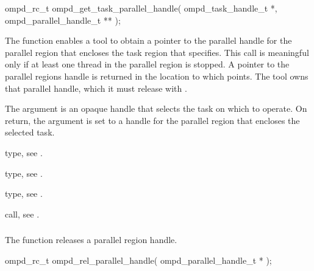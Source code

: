 \format
\begin{cspecific}
\begin{ompSyntax}
ompd_rc_t ompd_get_task_parallel_handle(
  ompd_task_handle_t *,
  ompd_parallel_handle_t **
);
\end{ompSyntax}
\end{cspecific}

\descr
The   function enables a tool to obtain a
pointer to the parallel handle for the parallel region that encloses the task 
region that  specifies. This call is meaningful only if at 
least one thread in the parallel region is stopped. A pointer to the parallel 
regions handle is returned in the location to which 
points. The tool owns that parallel handle, which it must release with 
.

\argdesc
The  argument is an opaque handle that selects the task on 
which to operate. On return, the  argument is set 
to a handle for the parallel region that encloses the selected task.

\begin{crossrefs}
\item {} type, see .

\item {} type, 
see .

\item {} type, see .

\item {} call, 
see .
\end{crossrefs}



\subsubsection{}
\label{subsubsubsec:ompd_rel_parallel_handle}
\summary
The  function releases a parallel region handle.

\format
\begin{cspecific}
\begin{ompSyntax}
ompd_rc_t ompd_rel_parallel_handle(
  ompd_parallel_handle_t *
);
\end{ompSyntax}
\end{cspecific}

